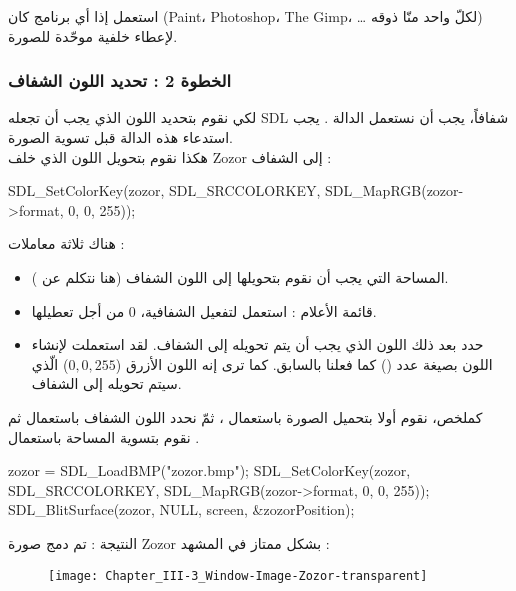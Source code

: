 استعمل إذا أي برنامج كان 
(\textenglish{Paint}، \textenglish{Photoshop}، \textenglish{The Gimp}، \dots
لكلّ واحد منّا ذوقه) لإعطاء خلفية موحّدة للصورة.

\subsubsection{الخطوة 2 : تحديد اللون الشفاف}

لكي نقوم بتحديد اللون الذي يجب أن تجعله
\textenglish{SDL}
شفافاً، يجب أن نستعمل الدالة 
.
يجب استدعاء هذه الدالة قبل تسوية الصورة.\\
هكذا نقوم بتحويل اللون الذي خلف
\textenglish{Zozor}
إلى الشفاف :

\begin{Csource}
SDL_SetColorKey(zozor, SDL_SRCCOLORKEY, SDL_MapRGB(zozor->format, 0, 0, 255));
\end{Csource}

هناك ثلاثة معاملات :

\begin{itemize}
	\item المساحة التي يجب أن نقوم بتحويلها إلى اللون الشفاف (هنا نتكلم عن 
	).
	\item قائمة الأعلام : استعمل 
	لتفعيل الشفافية، 0 من أجل تعطيلها.
	\item حدد بعد ذلك اللون الذي يجب أن يتم تحويله إلى الشفاف. لقد استعملت
	لإنشاء اللون بصيغة عدد
	()
	كما فعلنا بالسابق. كما ترى إنه اللون الأزرق 
	($0, 0, 255$)
	 الّذي سيتم تحويله إلى الشفاف.
	
\end{itemize}

كملخص، نقوم أولا بتحميل الصورة باستعمال
،
ثمّ نحدد اللون الشفاف باستعمال
ثم نقوم بتسوية المساحة باستعمال
.

\begin{Csource}
zozor = SDL_LoadBMP("zozor.bmp");
SDL_SetColorKey(zozor, SDL_SRCCOLORKEY, SDL_MapRGB(zozor->format, 0, 0, 255));
SDL_BlitSurface(zozor, NULL, screen, &zozorPosition);
\end{Csource}

النتيجة : تم دمج صورة
\textenglish{Zozor}
بشكل ممتاز في المشهد :

\begin{figure}[H]
	\centering
	\texttt{[image: Chapter\_III-3\_Window-Image-Zozor-transparent]}
\end{figure}

